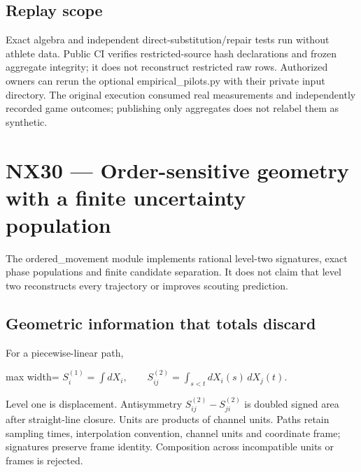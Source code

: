 \documentclass[
  11pt,
  a4paper,
]{report}
\begin{document}
\hypertarget{replay-scope}{%
\section{Replay scope}\label{replay-scope}}

Exact algebra and independent direct-substitution/repair tests run
without athlete data. Public CI verifies restricted-source hash
declarations and frozen aggregate integrity; it does not reconstruct
restricted raw rows. Authorized owners can rerun the optional
empirical\_pilots.py with their private input directory. The original
execution consumed real measurements and independently recorded game
outcomes; publishing only aggregates does not relabel them as synthetic.

\hypertarget{nx30-order-sensitive-geometry-with-a-finite-uncertainty-population}{%
\chapter{NX30 --- Order-sensitive geometry with a finite uncertainty
population}\label{nx30-order-sensitive-geometry-with-a-finite-uncertainty-population}}

The ordered\_movement module implements rational level-two signatures,
exact phase populations and finite candidate separation. It does not
claim that level two reconstructs every trajectory or improves scouting
prediction.

\hypertarget{geometric-information-that-totals-discard}{%
\section{Geometric information that totals
discard}\label{geometric-information-that-totals-discard}}

For a piecewise-linear path, \begin{center}
\begin{adjustbox}{max width=\linewidth}
$\displaystyle
S^{(1)}_i=\int dX_i,\qquad
S^{(2)}_{ij}=\int_{s<t}dX_i(s)\,dX_j(t).
$
\end{adjustbox}
\end{center} Level one is displacement. Antisymmetry \(S^{(2)}_{ij}-S^{(2)}_{ji}\)
is doubled signed area after straight-line closure. Units are products
of channel units. Paths retain sampling times, interpolation convention,
channel units and coordinate frame; signatures preserve frame identity.
Composition across incompatible units or frames is rejected.
\end{document}
